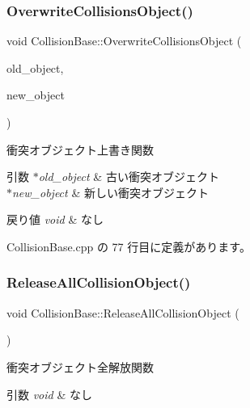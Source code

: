 \subsubsection{\texorpdfstring{Overwrite\+Collisions\+Object()}{OverwriteCollisionsObject()}}
{\footnotesize\ttfamily void Collision\+Base\+::\+Overwrite\+Collisions\+Object (\begin{DoxyParamCaption}\item[{\mbox{\hyperlink{class_collision_object}{Collision\+Object}} $\ast$}]{old\+\_\+object,  }\item[{\mbox{\hyperlink{class_collision_object}{Collision\+Object}} $\ast$}]{new\+\_\+object }\end{DoxyParamCaption})}



衝突オブジェクト上書き関数 


\begin{DoxyParams}{引数}
{\em $\ast$old\+\_\+object} & 古い衝突オブジェクト \\
\hline
{\em $\ast$new\+\_\+object} & 新しい衝突オブジェクト \\
\hline
\end{DoxyParams}

\begin{DoxyRetVals}{戻り値}
{\em void} & なし \\
\hline
\end{DoxyRetVals}


 Collision\+Base.\+cpp の 77 行目に定義があります。

\mbox{\label{class_collision_base_a0e7e2c7f76b517da9defb18f4046d9a9}} 
\subsubsection{\texorpdfstring{Release\+All\+Collision\+Object()}{ReleaseAllCollisionObject()}}
{\footnotesize\ttfamily void Collision\+Base\+::\+Release\+All\+Collision\+Object (\begin{DoxyParamCaption}{ }\end{DoxyParamCaption})}



衝突オブジェクト全解放関数 


\begin{DoxyParams}{引数}
{\em void} & なし \\
\hline
\end{DoxyParams}

